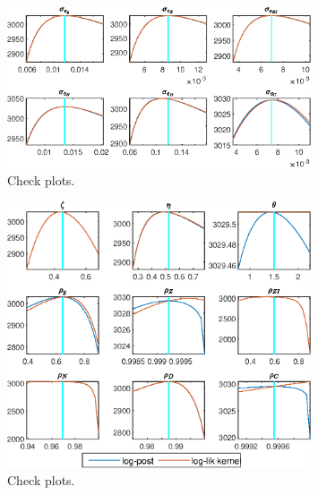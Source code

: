  
\begin{figure}[H]
\centering 
\includegraphics[width=0.80\textwidth]{BRS_imp_mobility_est/graphs/BRS_imp_mobility_est_CheckPlots1}
\caption{Check plots.}\label{Fig:CheckPlots:1}
\end{figure}
 
\begin{figure}[H]
\centering 
\includegraphics[width=0.80\textwidth]{BRS_imp_mobility_est/graphs/BRS_imp_mobility_est_CheckPlots2}
\caption{Check plots.}\label{Fig:CheckPlots:2}
\end{figure}
 
